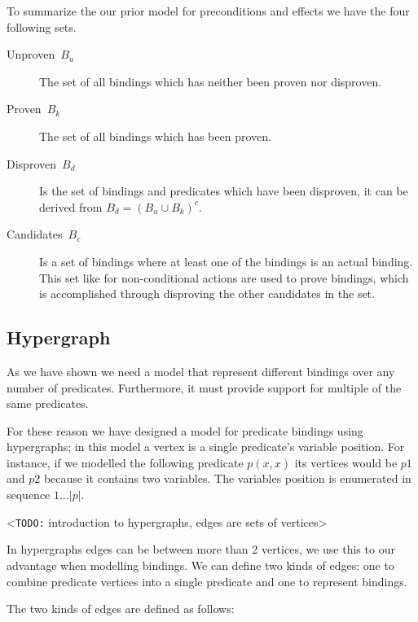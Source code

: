 \documentclass[../Master.tex]{subfiles}
\begin{document}
To summarize the our prior model for preconditions and effects we have the four following sets.
\begin{description}
	\item [{Unproven~$B_u$}] The set of all bindings which has
	neither been proven nor disproven.
	\item [{Proven~$B_k$}] The set of all bindings which has been
	proven.
	\item [{Disproven~$B_d$}] Is the set of bindings and predicates which have
	been disproven, it can be derived from $B_d={\left( B_u \cup B_k \right)}^c$.
	\item [{Candidates~$B_c$}] Is a set of bindings where at least one of the bindings is an actual binding.
	This set like for non-conditional actions are used to prove bindings,
	which is accomplished through disproving the other candidates in the set.
\end{description}


	\subsection*{Hypergraph}
	As we have shown we need a model that represent different bindings over any number of predicates.
	Furthermore, it must provide support for multiple of the same predicates.

	For these reason we have designed a model for predicate bindings using hypergraphs;
	in this	model a vertex is a single predicate's variable position.
	For instance, if we modelled the following predicate $p(x,x)$ its vertices would be $p1$ and $p2$ because it contains two variables.
	The variables position is enumerated in sequence $1\ldots |p|$.

	<\texttt{TODO:} introduction to hypergraphs, edges are sets of vertices>

	In hypergraphs edges can be between more than 2 vertices, we use this to our advantage when modelling bindings.
	We can define two kinds of edges: one to combine predicate vertices into a single predicate and one to represent bindings.

	The two kinds of edges are defined as follows:
\end{document}
